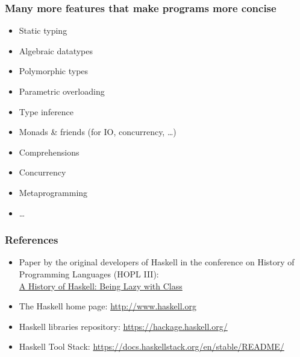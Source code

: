 \documentclass{beamer}
\begin{document}
\begin{frame}
  \frametitle{Many more features that make programs more concise}
  \begin{itemize}
  \item Static typing
  \item Algebraic datatypes
  \item Polymorphic types
  \item Parametric overloading
  \item Type inference
  \item Monads \& friends (for IO, concurrency, \dots)
  \item Comprehensions
  \item Concurrency
  \item Metaprogramming
  \item \dots
  \end{itemize}
\end{frame}
\begin{frame}
  \frametitle{References}
  \begin{itemize}
  \item Paper by the original developers of Haskell in the conference on History of
    Programming Languages (HOPL III):\\
    \href{http://dl.acm.org/citation.cfm?id=1238856}{A History of Haskell: Being Lazy with Class}
  \item The Haskell home page: \url{http://www.haskell.org}
  \item Haskell libraries repository:
    \url{https://hackage.haskell.org/}
  \item Haskell Tool Stack: \url{https://docs.haskellstack.org/en/stable/README/}
  \end{itemize}
\end{frame}


\begin{frame}
  \begin{center}
  \end{center}
\end{frame}
\end{document}
